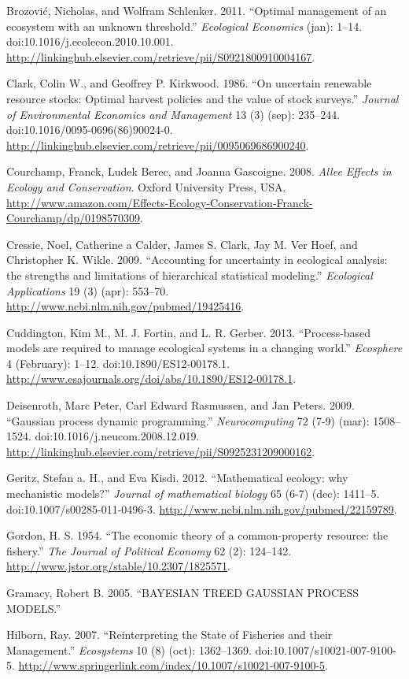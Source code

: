 \documentclass[author-year, review]{elsarticle} %
\begin{document}
Brozović, Nicholas, and Wolfram Schlenker. 2011. ``Optimal management of
an ecosystem with an unknown threshold.'' \emph{Ecological Economics}
(jan): 1--14. doi:10.1016/j.ecolecon.2010.10.001.
\url{http://linkinghub.elsevier.com/retrieve/pii/S0921800910004167}.

Clark, Colin W., and Geoffrey P. Kirkwood. 1986. ``On uncertain
renewable resource stocks: Optimal harvest policies and the value of
stock surveys.'' \emph{Journal of Environmental Economics and
Management} 13 (3) (sep): 235--244. doi:10.1016/0095-0696(86)90024-0.
\url{http://linkinghub.elsevier.com/retrieve/pii/0095069686900240}.

Courchamp, Franck, Ludek Berec, and Joanna Gascoigne. 2008. \emph{Allee
Effects in Ecology and Conservation}. Oxford University Press, USA.
\url{http://www.amazon.com/Effects-Ecology-Conservation-Franck-Courchamp/dp/0198570309}.

Cressie, Noel, Catherine a Calder, James S. Clark, Jay M. Ver Hoef, and
Christopher K. Wikle. 2009. ``Accounting for uncertainty in ecological
analysis: the strengths and limitations of hierarchical statistical
modeling.'' \emph{Ecological Applications} 19 (3) (apr): 553--70.
\url{http://www.ncbi.nlm.nih.gov/pubmed/19425416}.

Cuddington, Kim M., M. J. Fortin, and L. R. Gerber. 2013.
``Process-based models are required to manage ecological systems in a
changing world.'' \emph{Ecosphere} 4 (February): 1--12.
doi:10.1890/ES12-00178.1.
\url{http://www.esajournals.org/doi/abs/10.1890/ES12-00178.1}.

Deisenroth, Marc Peter, Carl Edward Rasmussen, and Jan Peters. 2009.
``Gaussian process dynamic programming.'' \emph{Neurocomputing} 72 (7-9)
(mar): 1508--1524. doi:10.1016/j.neucom.2008.12.019.
\url{http://linkinghub.elsevier.com/retrieve/pii/S0925231209000162}.

Geritz, Stefan a. H., and Eva Kisdi. 2012. ``Mathematical ecology: why
mechanistic models?'' \emph{Journal of mathematical biology} 65 (6-7)
(dec): 1411--5. doi:10.1007/s00285-011-0496-3.
\url{http://www.ncbi.nlm.nih.gov/pubmed/22159789}.

Gordon, H. S. 1954. ``The economic theory of a common-property resource:
the fishery.'' \emph{The Journal of Political Economy} 62 (2): 124--142.
\url{http://www.jstor.org/stable/10.2307/1825571}.

Gramacy, Robert B. 2005. ``BAYESIAN TREED GAUSSIAN PROCESS MODELS.''

Hilborn, Ray. 2007. ``Reinterpreting the State of Fisheries and their
Management.'' \emph{Ecosystems} 10 (8) (oct): 1362--1369.
doi:10.1007/s10021-007-9100-5.
\url{http://www.springerlink.com/index/10.1007/s10021-007-9100-5}.
\end{document}
